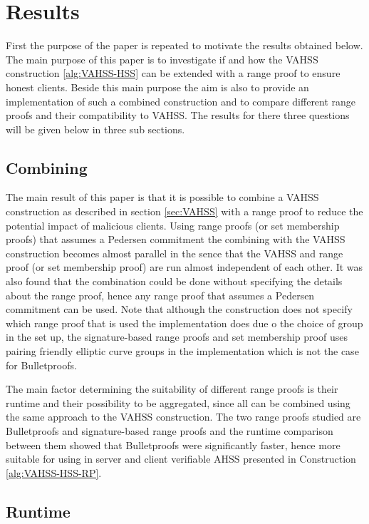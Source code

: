 \chapter{Results}
\label{ch:results}

First the purpose of the paper is repeated to motivate the results obtained below. The main purpose of this paper is to investigate if  and how the VAHSS construction \ref{alg:VAHSS-HSS} can be extended with a range proof to ensure honest clients. Beside this main purpose the aim is also to provide an implementation of such a combined construction and to compare different range proofs and their compatibility to VAHSS. The results for there three questions will be given below in three sub sections. 

\section{Combining}
The main result of this paper is that it is possible to combine a VAHSS construction as described in section \ref{sec:VAHSS} with a range proof to reduce the potential impact of malicious clients. Using range proofs (or set membership proofs) that assumes a Pedersen commitment the combining with the VAHSS construction becomes almost parallel in the sence that the VAHSS and range proof (or set membership proof) are run almost independent of each other. It was also found that the combination could be done without specifying the details about the range proof, hence any range proof that assumes a Pedersen commitment can be used. Note that although the construction does not specify which range proof that is used the implementation does due o the choice of group in the set up, the signature-based range proofs and set membership proof uses pairing friendly elliptic curve groups in the implementation which is not the case for Bulletproofs.

The main factor determining the suitability of different range proofs is their runtime and their possibility to be aggregated, since all can be combined using the same approach to the VAHSS construction. The two range proofs studied are Bulletproofs and signature-based range proofs and the runtime comparison between them showed that Bulletproofs were significantly faster, hence more suitable for using in server and client verifiable AHSS presented in Construction \ref{alg:VAHSS-HSS-RP}. 

\section{Runtime}

